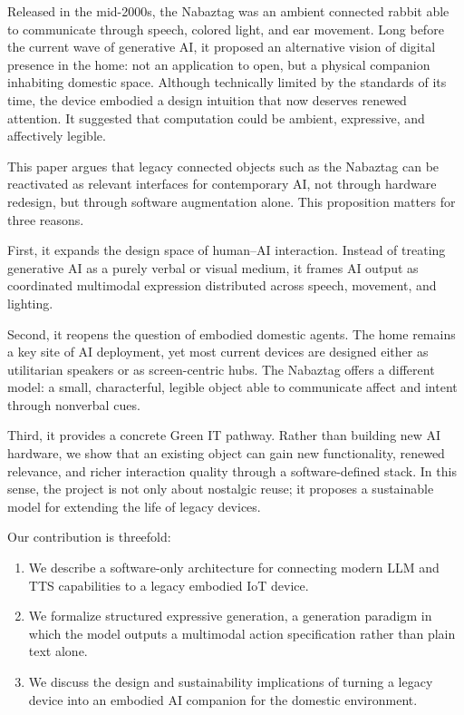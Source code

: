 \documentclass[11pt]{article}
\begin{document}
Released in the mid-2000s, the Nabaztag was an ambient connected rabbit able to communicate through speech, colored light, and ear movement. Long before the current wave of generative AI, it proposed an alternative vision of digital presence in the home: not an application to open, but a physical companion inhabiting domestic space. Although technically limited by the standards of its time, the device embodied a design intuition that now deserves renewed attention. It suggested that computation could be ambient, expressive, and affectively legible.

This paper argues that legacy connected objects such as the Nabaztag can be reactivated as relevant interfaces for contemporary AI, not through hardware redesign, but through software augmentation alone. This proposition matters for three reasons.

First, it expands the design space of human--AI interaction. Instead of treating generative AI as a purely verbal or visual medium, it frames AI output as coordinated multimodal expression distributed across speech, movement, and lighting.

Second, it reopens the question of embodied domestic agents. The home remains a key site of AI deployment, yet most current devices are designed either as utilitarian speakers or as screen-centric hubs. The Nabaztag offers a different model: a small, characterful, legible object able to communicate affect and intent through nonverbal cues.

Third, it provides a concrete Green IT pathway. Rather than building new AI hardware, we show that an existing object can gain new functionality, renewed relevance, and richer interaction quality through a software-defined stack. In this sense, the project is not only about nostalgic reuse; it proposes a sustainable model for extending the life of legacy devices.

Our contribution is threefold:

\begin{enumerate}[leftmargin=1.5em]
  \item We describe a software-only architecture for connecting modern LLM and TTS capabilities to a legacy embodied IoT device.
  \item We formalize structured expressive generation, a generation paradigm in which the model outputs a multimodal action specification rather than plain text alone.
  \item We discuss the design and sustainability implications of turning a legacy device into an embodied AI companion for the domestic environment.
\end{enumerate}
\end{document}
